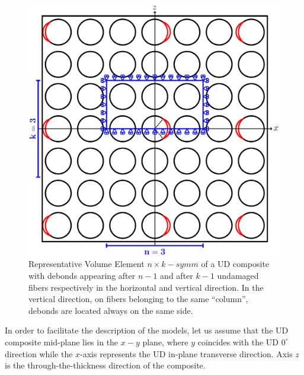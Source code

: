 \documentclass[smallextended]{svjour3}       %
\begin{document}
\begin{figure}[!h]
\centering
\includegraphics[width=\textwidth]{coupling.pdf}
\caption{Representative Volume Element $n\times k-symm$ of a UD composite with debonds appearing after $n-1$ and after $k-1$ undamaged fibers respectively in the horizontal and vertical direction. In the vertical direction, on fibers belonging to the same ``column'', debonds are located always on the same side.}\label{fig:laminateModelsA}
\end{figure}

In order to facilitate the description of the models, let us assume that the UD composite mid-plane lies in the $x-y$ plane, where $y$ coincides with the UD $0^{\circ}$ direction while the $x$-axis represents the UD in-plane transverse direction. Axis $z$ is the through-the-thickness direction of the composite.
\end{document}
